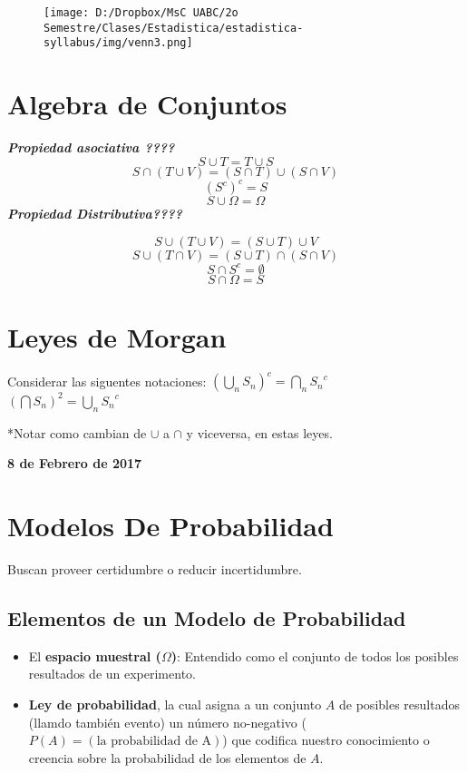 \documentclass[]{book}
\providecommand{\tightlist}{%
  \setlength{\itemsep}{0pt}\setlength{\parskip}{0pt}}
\begin{document}
\begin{figure}[htbp]
\centering
\texttt{[image: D:/Dropbox/MsC UABC/2o Semestre/Clases/Estadistica/estadistica-syllabus/img/venn3.png]}
\caption{}
\end{figure}

\section{Algebra de Conjuntos}\label{algebra-de-conjuntos-1}

\textbf{\emph{Propiedad asociativa ????}} \[S \cup T = T \cup S\]
\[S \cap (T \cup V) = (S \cap T) \cup (S \cap V)\] \[(S^c)^c = S\]
\[S \cup \Omega = \Omega\] \textbf{\emph{Propiedad Distributiva????}}

\[S \cup (T \cup V) = (S \cup T)\cup V\]
\[S \cup (T \cap V) = (S \cup T)\cap (S \cap V)\]
\[S \cap S^c = \emptyset\] \[S \cap \Omega = S\]

\section{Leyes de Morgan}\label{leyes-de-morgan-1}

Considerar las siguentes notaciones:
\((\bigcup_{n}^{}S_n)^c = \bigcap_{n}^{}{S_n}^c\)\\
 \((\bigcap S_n)^2 = \bigcup_{n}^{}{S_n}^c\)

*Notar como cambian de \(\cup\) a \(\cap\) y viceversa, en estas leyes.

\textbf{8 de Febrero de 2017}

\section{Modelos De Probabilidad}\label{modelos-de-probabilidad-1}

Buscan proveer certidumbre o reducir incertidumbre.

\subsection{Elementos de un Modelo de
Probabilidad}\label{elementos-de-un-modelo-de-probabilidad-1}

\begin{itemize}
\tightlist
\item
  El \textbf{espacio muestral (\(\Omega\))}: Entendido como el conjunto
  de todos los posibles resultados de un experimento.
\item
  \textbf{Ley de probabilidad}, la cual asigna a un conjunto \(A\) de
  posibles resultados (llamdo también evento) un número no-negativo
  (\(P(A) = (\text{la probabilidad de A})\)) que codifica nuestro
  conocimiento o creencia sobre la probabilidad de los elementos de
  \(A\).
\end{itemize}
\end{document}
